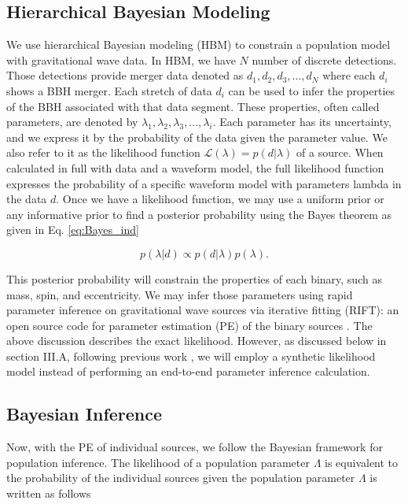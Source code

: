 \documentclass[twocolumn,prd,nofootinbib]{revtex4}
\begin{document}
\subsection{Hierarchical Bayesian Modeling}

We use hierarchical Bayesian modeling (HBM) to constrain a population model with gravitational wave data. 
In HBM, we have $N$ number of discrete detections. Those detections provide merger data denoted as 
$d_1,d_2,d_3,...,d_N$ where each $d_i$ shows a BBH merger. Each stretch of data $d_i$ can
be used to infer the properties of the BBH associated with that data segment. These properties, often 
called parameters, are denoted by $\lambda_1,\lambda_2,\lambda_3,...,\lambda_i$. Each parameter has
its uncertainty, and we express it by the probability of the data given the parameter value. We also 
refer to it as the likelihood function $\mathcal{L}(\lambda)=p(d|\lambda)$ of a source. When 
calculated in full with data and a waveform model, the full likelihood function
expresses the probability of a specific waveform model with parameters lambda in the data $d$. 
Once we have a likelihood function, we may use a uniform prior or any informative prior to find a posterior 
probability using the Bayes theorem as given in Eq. \ref{eq:Bayes_ind}

\begin{equation}
\label{eq:Bayes_ind}    
p(\lambda|d) \propto p(d|\lambda) p(\lambda).
\end{equation}

This posterior probability will constrain the properties of each binary, such as mass, spin, and eccentricity.
We may infer those parameters using rapid parameter inference on gravitational wave sources via iterative 
fitting (RIFT): an open source code for parameter estimation (PE) of the binary sources \cite{rift_2018}.
The above discussion describes the exact likelihood.  However, as discussed below in section
III.A, following previous work \cite{2017MNRAS.465.3254M}, we will employ a synthetic likelihood model instead of performing an 
end-to-end parameter inference calculation.

\subsection{Bayesian Inference}

Now, with the PE of individual sources, we follow the Bayesian framework for population inference.
The likelihood of a population parameter $\Lambda$ is equivalent to the probability of the individual 
sources given the population parameter $\Lambda$ is written as follows
\end{document}
